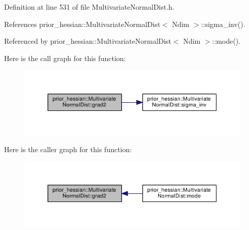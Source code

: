 Definition at line 531 of file Multivariate\+Normal\+Dist.\+h.



References prior\+\_\+hessian\+::\+Multivariate\+Normal\+Dist$<$ Ndim $>$\+::sigma\+\_\+inv().



Referenced by prior\+\_\+hessian\+::\+Multivariate\+Normal\+Dist$<$ Ndim $>$\+::mode().



Here is the call graph for this function\+:\nopagebreak
\begin{figure}[H]
\begin{center}
\leavevmode
\includegraphics[width=350pt]{classprior__hessian_1_1MultivariateNormalDist_abddd70ca592cc71d9269f227ef53f90a_cgraph}
\end{center}
\end{figure}




Here is the caller graph for this function\+:\nopagebreak
\begin{figure}[H]
\begin{center}
\leavevmode
\includegraphics[width=350pt]{classprior__hessian_1_1MultivariateNormalDist_abddd70ca592cc71d9269f227ef53f90a_icgraph}
\end{center}
\end{figure}


